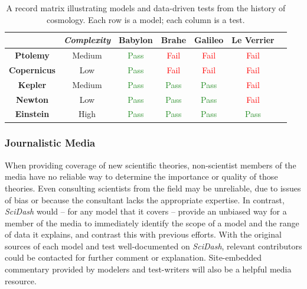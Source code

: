 \documentclass[11pt,letterpaper]{article}
\begin{document}
\begin{table}
\caption{A record matrix illustrating models and data-driven tests from the history of cosmology. Each row is a model; each column is a test.}
\label{table:record_matrix}
\begin{tabular}{| c | c | c | c | c | c | c }
\hline
		& \textit{Complexity} & \textbf{Babylon} & \textbf{Brahe} & \textbf{Galileo} & \textbf{Le Verrier} \\ \hline
	\textbf{Ptolemy} & Medium & \textcolor{ForestGreen}{Pass} & \textcolor{Red}{Fail} & \textcolor{Red}{Fail} & \textcolor{Red}{Fail} \\ \hline
	\textbf{Copernicus} & Low & \textcolor{ForestGreen}{Pass} & \textcolor{Red}{Fail} & \textcolor{Red}{Fail} & \textcolor{Red}{Fail} \\ \hline
	\textbf{Kepler} & Medium & \textcolor{ForestGreen}{Pass} & \textcolor{ForestGreen}{Pass} & \textcolor{ForestGreen}{Pass} & \textcolor{Red}{Fail} \\ \hline
	\textbf{Newton} & Low & \textcolor{ForestGreen}{Pass} & \textcolor{ForestGreen}{Pass} & \textcolor{ForestGreen}{Pass} & \textcolor{Red}{Fail} \\ \hline
	\textbf{Einstein} & High & \textcolor{ForestGreen}{Pass} & \textcolor{ForestGreen}{Pass} & \textcolor{ForestGreen}{Pass} & \textcolor{ForestGreen}{Pass} \\ \hline
\end{tabular}
\end{table}
\leavevmode

\subsubsection{Journalistic Media}
When providing coverage of new scientific theories, non-scientist members of the media have no reliable way to determine the importance or quality of those theories.  Even consulting scientists from the field may be unreliable, due to issues of bias or because the consultant lacks the appropriate expertise.  In contrast, \textit{SciDash} would -- for any model that it covers -- provide an unbiased way for a member of the media to immediately identify the scope of a model and the range of data it explains, and contrast this with previous efforts.  With the original sources of each model and test well-documented on \textit{SciDash}, relevant contributors could be contacted for further comment or explanation.  Site-embedded commentary provided by modelers and test-writers will also be a helpful media resource.  
\end{document}

